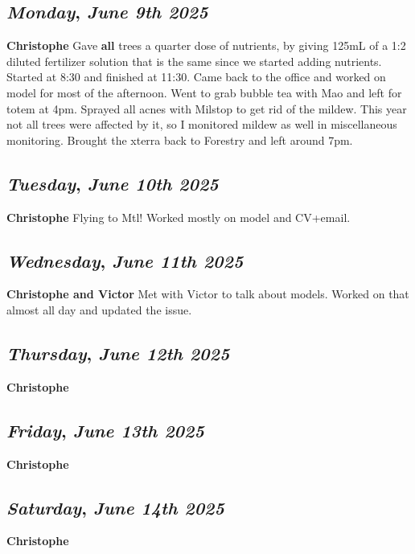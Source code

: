 \def\day{\textit{June 9th 2025}}
\def\weekday{\textit{Monday}}
\subsection*{\weekday, \day}
\textbf {Christophe}
Gave \textbf{all} trees a quarter dose of nutrients, by giving 125mL of a 1:2 diluted fertilizer solution that is the same since we started adding nutrients. Started at 8:30 and finished at 11:30. Came back to the office and worked on model for most of the afternoon. Went to grab bubble tea with Mao and left for totem at 4pm. Sprayed all acnes with Milstop to get rid of the mildew. This year not all trees were affected by it, so I monitored mildew as well in miscellaneous monitoring. Brought the xterra back to Forestry and left around 7pm. 

\def\day{\textit{June 10th 2025}}
\def\weekday{\textit{Tuesday}}
\subsection*{\weekday, \day}
\textbf {Christophe}
Flying to Mtl! Worked mostly on model and CV+email.

\def\day{\textit{June 11th 2025}}
\def\weekday{\textit{Wednesday}}
\subsection*{\weekday, \day}
\textbf {Christophe and Victor}
Met with Victor to talk about models. Worked on that almost all day and updated the issue. 

\def\day{\textit{June 12th 2025}}
\def\weekday{\textit{Thursday}}
\subsection*{\weekday, \day}
\textbf {Christophe}

\def\day{\textit{June 13th 2025}}
\def\weekday{\textit{Friday}}
\subsection*{\weekday, \day}
\textbf {Christophe}

\def\day{\textit{June 14th 2025}}
\def\weekday{\textit{Saturday}}
\subsection*{\weekday, \day}
\textbf {Christophe}

\def\day{\textit{June 15th 2025}}
\def\weekday{\textit{Sunday}}
